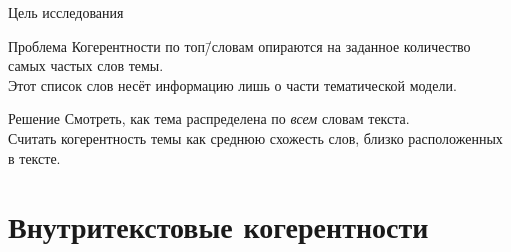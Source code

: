 \documentclass[sans, mathsans, russian]{beamer}
\begin{document}
\begin{frame}{Цель исследования}
  \begin{block}{Проблема}
    Когерентности по топ\=/словам опираются на заданное количество самых частых слов темы.\\
    Этот список слов несёт информацию лишь о части тематической модели.
  \end{block}
  \begin{block}{Решение}
    Смотреть, как тема распределена по \emph{всем} словам текста.\\
    Считать когерентность темы как среднюю схожесть слов, близко расположенных в тексте.
  \end{block}
\end{frame}




%  
%  



\section{Внутритекстовые когерентности}
\end{document}
